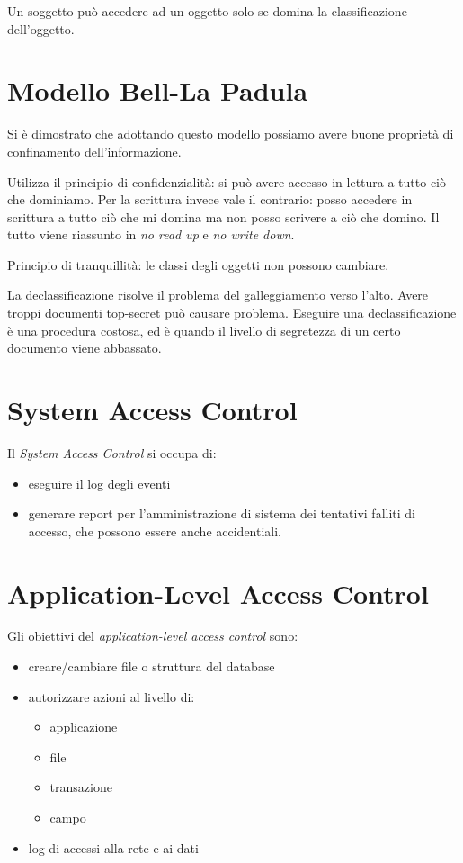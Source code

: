 Un soggetto può accedere ad un oggetto solo se domina la classificazione
dell'oggetto.

\section{Modello Bell-La Padula}

Si è dimostrato che adottando questo modello possiamo avere buone proprietà di
confinamento dell'informazione.

Utilizza il principio di confidenzialità: si può avere accesso in lettura a
tutto ciò che dominiamo. Per la scrittura invece vale il contrario: posso
accedere in scrittura a tutto ciò che mi domina ma non posso scrivere a ciò che
domino. Il tutto viene riassunto in \textit{no read up} e \textit{no write
down}.

Principio di tranquillità: le classi degli oggetti non possono cambiare.

La declassificazione risolve il problema del galleggiamento verso l'alto. Avere
troppi documenti top-secret può causare problema. Eseguire una
declassificazione è una procedura costosa, ed è quando il livello di segretezza
di un certo documento viene abbassato.

\section{System Access Control}

Il \textit{System Access Control} si occupa di:
\begin{itemize}
 \item eseguire il log degli eventi
 \item generare report per l'amministrazione di sistema dei tentativi falliti
di accesso, che possono essere anche accidentiali.
\end{itemize}

\section{Application-Level Access Control}

Gli obiettivi del \textit{application-level access control} sono:
\begin{itemize}
 \item creare/cambiare file o struttura del database
 \item autorizzare azioni al livello di:
  \begin{itemize}
   \item applicazione
   \item file
   \item transazione
   \item campo
  \end{itemize}
\item log di accessi alla rete e ai dati
\end{itemize}

